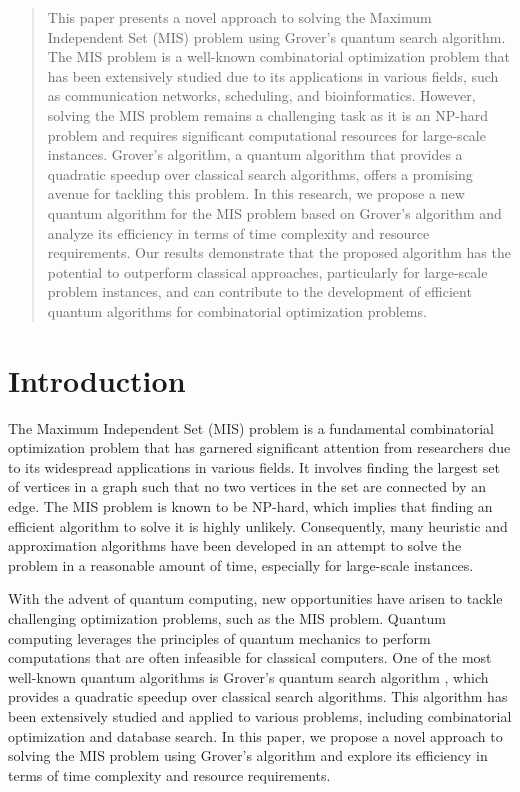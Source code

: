 \begin{abstract}
This paper presents a novel approach to solving the Maximum Independent Set (MIS) problem using Grover's quantum search algorithm. The MIS problem is a well-known combinatorial optimization problem that has been extensively studied due to its applications in various fields, such as communication networks, scheduling, and bioinformatics. However, solving the MIS problem remains a challenging task as it is an NP-hard problem and requires significant computational resources for large-scale instances. Grover's algorithm, a quantum algorithm that provides a quadratic speedup over classical search algorithms, offers a promising avenue for tackling this problem. In this research, we propose a new quantum algorithm for the MIS problem based on Grover's algorithm and analyze its efficiency in terms of time complexity and resource requirements. Our results demonstrate that the proposed algorithm has the potential to outperform classical approaches, particularly for large-scale problem instances, and can contribute to the development of efficient quantum algorithms for combinatorial optimization problems.

\end{abstract}

\section{Introduction}
\label{sec:introduction}

The Maximum Independent Set (MIS) problem is a fundamental combinatorial optimization problem that has garnered significant attention from researchers due to its widespread applications in various fields. It involves finding the largest set of vertices in a graph such that no two vertices in the set are connected by an edge. The MIS problem is known to be NP-hard, which implies that finding an efficient algorithm to solve it is highly unlikely. Consequently, many heuristic and approximation algorithms have been developed in an attempt to solve the problem in a reasonable amount of time, especially for large-scale instances.

With the advent of quantum computing, new opportunities have arisen to tackle challenging optimization problems, such as the MIS problem. Quantum computing leverages the principles of quantum mechanics to perform computations that are often infeasible for classical computers. One of the most well-known quantum algorithms is Grover's quantum search algorithm \cite{grover1996fast}, which provides a quadratic speedup over classical search algorithms. This algorithm has been extensively studied and applied to various problems, including combinatorial optimization and database search. In this paper, we propose a novel approach to solving the MIS problem using Grover's algorithm and explore its efficiency in terms of time complexity and resource requirements.

